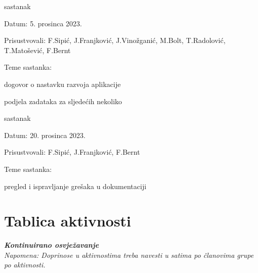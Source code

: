 \begin{packed_enum}
			\item  sastanak
			\item[] \begin{packed_item}
				\item Datum: 5. prosinca 2023.
				\item Prisustvovali: F.Sipić, J.Franjković, J.Vinožganić, M.Bolt, T.Radolović, T.Matošević, F.Bernt
				\item Teme sastanka:
				\begin{packed_item}
					\item  dogovor o nastavku razvoja aplikacije
					\item podjela zadataka za sljedećih nekoliko
				\end{packed_item}
			\end{packed_item}

			\item  sastanak
			\item[] \begin{packed_item}
				\item Datum: 20. prosinca 2023.
				\item Prisustvovali: F.Sipić, J.Franjković, F.Bernt
				\item Teme sastanka:
				\begin{packed_item}
					\item  pregled i ispravljanje grešaka u dokumentaciji
				\end{packed_item}
			\end{packed_item}
			
			
		\end{packed_enum}
		
		\eject
		\section*{Tablica aktivnosti}
		
			\textbf{\textit{Kontinuirano osvježavanje}}\\
			
			 \textit{Napomena: Doprinose u aktivnostima treba navesti u satima po članovima grupe po aktivnosti.}

